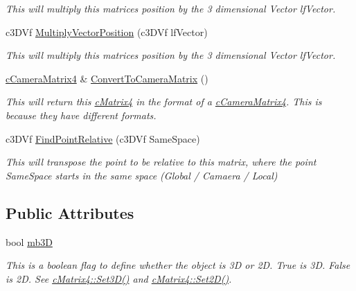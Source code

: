 \begin{DoxyCompactItemize}
\begin{DoxyCompactList}\small\item\em This will multiply this matrices position by the 3 dimensional Vector lfVector. \end{DoxyCompactList}\item 
\hypertarget{classc_matrix4_a802eff4e68910ce08624ec1a9c3258ad}{
c3DVf \hyperlink{classc_matrix4_a802eff4e68910ce08624ec1a9c3258ad}{MultiplyVectorPosition} (c3DVf lfVector)}
\label{classc_matrix4_a802eff4e68910ce08624ec1a9c3258ad}

\begin{DoxyCompactList}\small\item\em This will multiply this matrices position by the 3 dimensional Vector lfVector. \end{DoxyCompactList}\item 
\hypertarget{classc_matrix4_ac6bb495542c08395c26fd412db13a959}{
\hyperlink{classc_camera_matrix4}{cCameraMatrix4} \& \hyperlink{classc_matrix4_ac6bb495542c08395c26fd412db13a959}{ConvertToCameraMatrix} ()}
\label{classc_matrix4_ac6bb495542c08395c26fd412db13a959}

\begin{DoxyCompactList}\small\item\em This will return this \hyperlink{classc_matrix4}{cMatrix4} in the format of a \hyperlink{classc_camera_matrix4}{cCameraMatrix4}. This is because they have different formats. \end{DoxyCompactList}\item 
\hypertarget{classc_matrix4_a1b1f976f0ef9b6dd5570e1f6b376d2c1}{
c3DVf \hyperlink{classc_matrix4_a1b1f976f0ef9b6dd5570e1f6b376d2c1}{FindPointRelative} (c3DVf SameSpace)}
\label{classc_matrix4_a1b1f976f0ef9b6dd5570e1f6b376d2c1}

\begin{DoxyCompactList}\small\item\em This will transpose the point to be relative to this matrix, where the point SameSpace starts in the same space (Global / Camaera / Local) \end{DoxyCompactList}\end{DoxyCompactItemize}
\subsection*{Public Attributes}
\begin{DoxyCompactItemize}
\item 
\hypertarget{classc_matrix4_ac0ebba0d10d97c6657dccd1575f761ab}{
bool \hyperlink{classc_matrix4_ac0ebba0d10d97c6657dccd1575f761ab}{mb3D}}
\label{classc_matrix4_ac0ebba0d10d97c6657dccd1575f761ab}

\begin{DoxyCompactList}\small\item\em This is a boolean flag to define whether the object is 3D or 2D. True is 3D. False is 2D. See \hyperlink{classc_matrix4_a746ce09337cbf6a3292cbe15991efd79}{cMatrix4::Set3D()} and \hyperlink{classc_matrix4_ad24236403317622459c3309938be9d21}{cMatrix4::Set2D()}. \end{DoxyCompactList}\end{DoxyCompactItemize}
